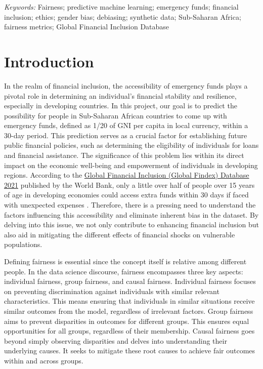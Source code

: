 \documentclass[12pt]{article}
\begin{document}
\noindent%
{\it Keywords:} Fairness; predictive machine learning; emergency funds;
financial inclusion; ethics; gender bias; debiasing; synthetic data;
Sub-Saharan Africa; fairness metrics; Global Financial Inclusion
Database

\vfill

\newpage
{} %

\hypertarget{introduction}{%
\section{Introduction}\label{introduction}}

In the realm of financial inclusion, the accessibility of emergency
funds plays a pivotal role in determining an individual's financial
stability and resilience, especially in developing
countries.\citep{10.1093/oso/9780198827535.003.0007} In this project,
our goal is to predict the possibility for people in Sub-Saharan African
countries to come up with emergency funds, defined as 1/20 of GNI per
capita in local currency, within a 30-day
period\citep{Demirguc-Kunt2022}. This prediction serves as a crucial
factor for establishing future public financial policies, such as
determining the eligibility of individuals for loans and financial
assistance. The significance of this problem lies within its direct
impact on the economic well-being and empowerment of individuals in
developing regions. According to the
\href{https://www.worldbank.org/en/publication/globalfindex}{Global
Financial Inclusion (Global Findex) Database 2021} published by the
World Bank, only a little over half of people over 15 years of age in
developing economies could access extra funds within 30 days if faced
with unexpected expenses \citep{Demirguc-Kunt2022}. Therefore, there is
a pressing need to understand the factors influencing this accessibility
and eliminate inherent bias in the dataset. By delving into this issue,
we not only contribute to enhancing financial inclusion but also aid in
mitigating the different effects of financial shocks on vulnerable
populations.

Defining fairness is essential since the concept itself is relative
among different people. In the data science discourse, fairness
encompasses three key aspects: individual fairness, group fairness, and
causal fairness\citep{Kypraiou2021What}. Individual fairness focuses on
preventing discrimination against individuals with similar relevant
characteristics. This means ensuring that individuals in similar
situations receive similar outcomes from the model, regardless of
irrelevant factors\citep{10.1145/3461702.3462621}. Group fairness aims
to prevent disparities in outcomes for different groups. This ensures
equal opportunities for all groups, regardless of their
membership\citep{10.1145/3442188.3445876}. Causal fairness goes beyond
simply observing disparities and delves into understanding their
underlying causes. It seeks to mitigate these root causes to achieve
fair outcomes within and across groups\citep{plecko2022causal}.
\end{document}

